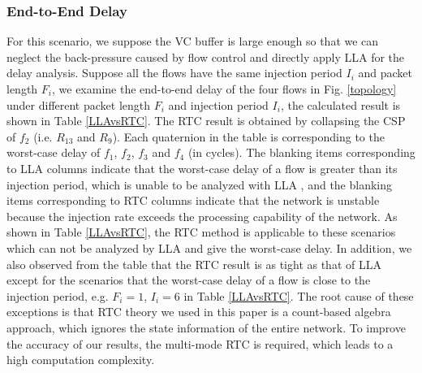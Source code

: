 \documentclass[10pt,journal]{IEEEtran}
\begin{document}
\subsubsection{End-to-End Delay}
For this scenario, we suppose the VC buffer is large enough so that we can neglect the back-pressure caused by flow control and directly apply LLA for the delay analysis. Suppose all the flows have the same injection period $I_i$ and packet length $F_i$, we examine the end-to-end delay of the four flows in Fig. \ref{topology} under different packet length $F_i$ and injection period $I_i$, the calculated result is shown in Table \ref{LLAvsRTC}. The RTC result is obtained by collapsing the CSP of $f_2$ (i.e. $R_{13}$ and $R_{9}$). Each quaternion in the table is corresponding to the worst-case delay of $f_1$, $f_2$, $f_3$ and $f_4$ (in cycles). The blanking items corresponding to LLA columns indicate that the worst-case delay of a flow is greater than its injection period, which is unable to be analyzed with LLA \cite{73}\cite{189}, and the blanking items corresponding to RTC columns indicate that the network is unstable because the injection rate exceeds the processing capability of the network. As shown in Table \ref{LLAvsRTC}, the RTC method is applicable to these scenarios which can not be analyzed by LLA and give the worst-case delay. In addition, we also observed from the table that the RTC result is as tight as that of LLA except for the scenarios that the worst-case delay of a flow is close to the injection period, e.g. $F_i=1$, $I_i=6$ in Table \ref{LLAvsRTC}. The root cause of these exceptions is that RTC theory we used in this paper is a count-based algebra approach, which ignores the state information of the entire network. To improve the accuracy of our results, the multi-mode RTC \cite{Phan2008MultiMode} is required, which leads to a high computation complexity.
\end{document}
